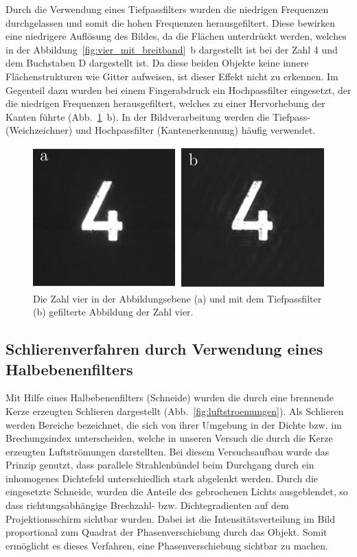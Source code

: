 Durch die Verwendung eines Tiefpassfilters wurden die niedrigen Frequenzen durchgelassen und somit die hohen Frequenzen herausgefiltert. Diese bewirken eine niedrigere Auflösung des
Bildes, da die Flächen unterdrückt werden, welches in der Abbildung~\ref{fig:vier_mit_breitband}~b dargestellt ist bei der Zahl 4 und dem Buchstaben D dargestellt ist. Da diese beiden Objekte keine innere Flächenstrukturen wie Gitter aufweisen, ist dieser Effekt nicht zu erkennen.
Im Gegenteil dazu wurden bei einem Fingerabdruck ein Hochpassfilter eingesetzt, der die niedrigen Frequenzen herausgefiltert, welches zu einer Hervorhebung der Kanten führte (Abb.~\ref{fig:vier_mit_tiefpass}~b). In der Bildverarbeitung werden die Tiefpass- (Weichzeichner) und Hochpassfilter (Kantenerkennung) häufig verwendet.

\begin{figure}[h]
	\centering
	\includegraphics{images/Regina/abb23.pdf}
	\caption[Zahl 4 mit Tiefpassfilter]{
		Die Zahl vier in der Abbildungsebene (a) und mit dem Tiefpassfilter (b) gefilterte Abbildung der Zahl vier.
	}
	\label{fig:vier_mit_tiefpass}
\end{figure}

\subsection{Schlierenverfahren durch Verwendung eines Halbebenenfilters}

Mit Hilfe eines Halbebenenfilters (Schneide) wurden die durch   eine brennende Kerze erzeugten Schlieren dargestellt (Abb.~\ref{fig:luftstroemungen}). Als Schlieren werden Bereiche bezeichnet, die sich von ihrer Umgebung  in  der  Dichte  bzw.  im  Brechungsindex  unterscheiden,  welche  in  unseren Versuch die durch  die  Kerze erzeugten Luftströmungen darstellten. Bei diesem Versuchsaufbau  wurde  das  Prinzip  genutzt,  dass  parallele  Strahlenbündel  beim  Durchgang durch   ein   inhomogenes Dichtefeld   unterschiedlich   stark   abgelenkt   werden.   Durch   die eingesetzte  Schneide,  wurden  die  Anteile  des  gebrochenen  Lichts  ausgeblendet,  so  dass richtungsabhängige  Brechzahl-  bzw.  Dichtegradienten auf  dem  Projektionsschirm  sichtbar wurden. Dabei ist die Intensitätsverteilung im   Bild   proportional   zum   Quadrat   der Phasenverschiebung   durch   das   Objekt.   Somit   ermöglicht es dieses Verfahren, eine Phasenverschiebung sichtbar zu machen. 